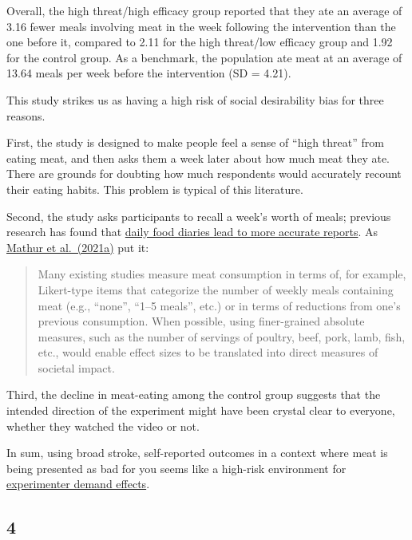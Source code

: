 \documentclass[
  man]{apa6}
\begin{document}
Overall, the high threat/high efficacy group reported that they ate an average of 3.16 fewer meals involving meat in the week following the intervention than the one before it, compared to 2.11 for the high threat/low efficacy group and 1.92 for the control group. As a benchmark, the population ate meat at an average of 13.64 meals per week before the intervention (SD = 4.21).

This study strikes us as having a high risk of social desirability bias for three reasons.

First, the study is designed to make people feel a sense of ``high threat'' from eating meat, and then asks them a week later about how much meat they ate. There are grounds for doubting how much respondents would accurately recount their eating habits. This problem is typical of this literature.

Second, the study asks participants to recall a week's worth of meals; previous research has found that \href{https://pubmed.ncbi.nlm.nih.gov/7635601/}{daily food diaries lead to more accurate reports}. As \href{https://www.sciencedirect.com/science/article/pii/S0195666321001847}{Mathur et al.~(2021a)} put it:

\begin{quote}
Many existing studies measure meat consumption in terms of, for example, Likert-type items that categorize the number of weekly meals containing meat (e.g., ``none'', ``1--5 meals'', etc.) or in terms of reductions from one's previous consumption. When possible, using finer-grained absolute measures, such as the number of servings of poultry, beef, pork, lamb, fish, etc., would enable effect sizes to be translated into direct measures of societal impact.
\end{quote}

Third, the decline in meat-eating among the control group suggests that the intended direction of the experiment might have been crystal clear to everyone, whether they watched the video or not.

In sum, using broad stroke, self-reported outcomes in a context where meat is being presented as bad for you seems like a high-risk environment for \href{https://www.elgaronline.com/display/edcoll/9781788110556/9781788110556.00031.xml}{experimenter demand effects}.

\subsection{4}\label{section-1}
\end{document}
